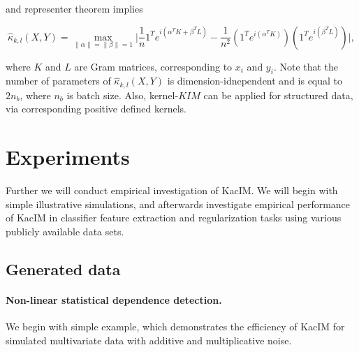 \documentclass{article}
\begin{document}
and representer theorem\cite{?} implies 

\begin{equation}
\label{eq:kernel_estimator1}
    \hat{\kappa}_{k,l} (X,Y) = \max_{\|\alpha\| = \|\beta\| = 1} \vert \frac{1}{n} 1^{T} e^{i(\alpha^{T} K + \beta^{T} L)} - \frac{1}{n^2} (1^{T} e^{i(\alpha^{T}K)}) (1^{T} e^{i(\beta^{T}L)}) \vert,
\end{equation}

where $K$ and $L$ are Gram matrices, corresponding to $x_{i}$ and $y_{i}$. Note that the number of parameters of $\hat{\kappa}_{k,l} (X,Y)$ is dimension-idnependent and is equal to $2n_{b}$, where $n_{b}$ is batch size. Also, kernel-$KIM$ can be applied for structured data, via corresponding positive defined kernels.

\section{Experiments}
\label{section:experiments}

Further we will conduct empirical investigation of KacIM. We will begin with simple illustrative simulations, and afterwards investigate empirical performance of KacIM in classifier feature extraction and regularization tasks using various publicly available data sets.

\subsection{Generated data}

\paragraph{Non-linear statistical dependence detection.} We begin with simple example, which demonstrates the efficiency of KacIM for simulated multivariate data with additive and multiplicative noise.
\end{document}
